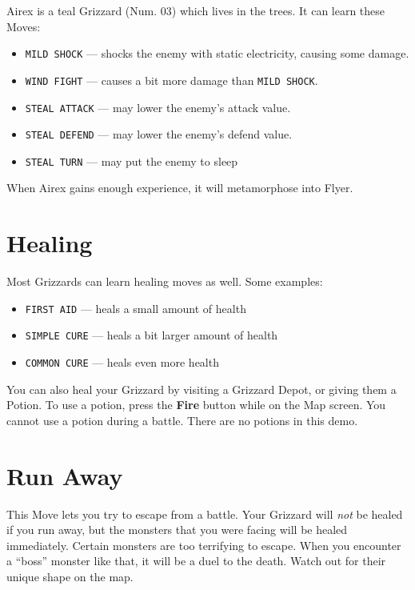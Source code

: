 \documentclass[10pt,twocolumn,openany,article]{memoir}
\begin{document}
Airex is  a teal  Grizzard (Num. 03)  which lives in  the trees.  It can
learn these Moves:

\begin{itemize}
\item \texttt{MILD SHOCK} --- shocks  the enemy with static electricity,
  causing some damage.
\item \texttt{WIND FIGHT} --- causes a bit more damage than \texttt{MILD SHOCK}.
\item \texttt{STEAL ATTACK} --- may lower the enemy's attack value.
\item \texttt{STEAL DEFEND} --- may lower the enemy's defend value.
\item \texttt{STEAL TURN} --- may put the enemy to sleep
\end{itemize}

When Airex gains enough experience, it will metamorphose into Flyer.

\fi

\ifdefined\ATARIAGESAVE
\pagebreak
\fi

\section{Healing}

Most Grizzards can learn healing moves as well. Some examples:

\begin{itemize}
\item \texttt{FIRST AID} --- heals a small amount of health
\item \texttt{SIMPLE CURE} --- heals a bit larger amount of health
\item \texttt{COMMON CURE} --- heals even more health
\end{itemize}

You can also heal your Grizzard  by visiting a Grizzard Depot, or giving
them a Potion. To use a  potion, press the \textbf{Fire} button while on
the Map screen. You cannot use a potion during a battle. \ifdefined\DEMO
There are no potions in this demo. \fi

\section{Run Away}

This  Move lets  you try  to escape  from a  battle. Your  Grizzard will
\emph{not} be  healed if you  run away, but  the monsters that  you were
facing will be  healed immediately. Certain monsters  are too terrifying
to escape. When  you encounter a ``boss'' monster like  that, it will be
a duel to the death. Watch out for their unique shape on the map.
\end{document}
